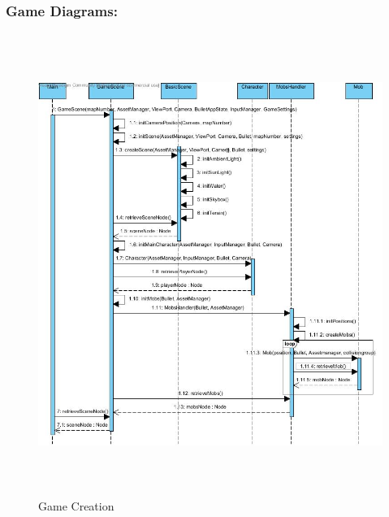 \documentclass[letterpaper]{article}
\begin{document}
				\subsubsection*{Game Diagrams:}
				\vspace{0.1in}
				
					\begin{figure}[H]
					\centering
					\includegraphics[width=180mm, height=150mm]{UML_Diagram/Sequence/Game_Creation.jpg}
					\caption{Game Creation}
					\label{overflow}
					\end{figure}
					
\end{document}
